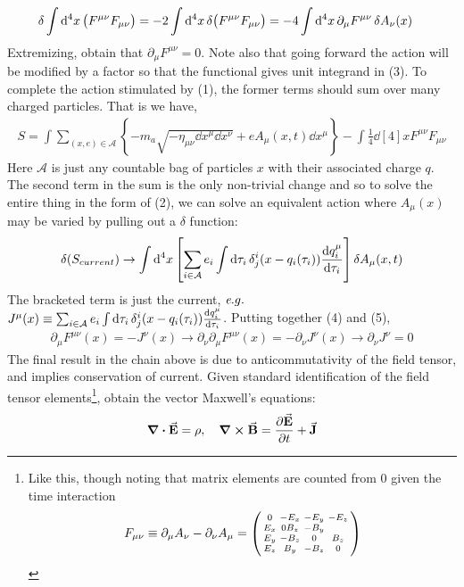 \documentclass[10pt]{scrartcl}
\newcommand{\eg}{{\textit e.g.}}
\begin{document}
\begin{align}
\var{\int \dd[4]{x}\left(F^{\mu\nu} F_{\mu\nu}\right)}	 = -2\int\dd[4]{x} \var(F^{\mu\nu}{F_{\mu\nu}}) &= -4\int\dd[4]{x}\partial_{\mu}F^{\mu\nu}\var{A_\nu(x)}
\end{align}
Extremizing, obtain that $\partial_\mu F^{\mu\nu} = 0$. Note also that going forward the action will be modified by a factor so that the functional gives unit integrand in (3). To complete the action stimulated by (1), the former terms should sum over many charged particles. That is we have,
\begin{align}
S = \int\sum_{(x, e)\in\mathcal{A}}\left\{-m_a\sqrt{-\eta_{\mu\nu}\dd{x}^\mu \dd{x}^{\nu}}+e A_{\mu}(x, t)\dd{x}^{\mu}\right\}-\int\frac{1}{4} \dd[4]{x} F^{\mu\nu}F_{\mu\nu}
\end{align}
Here $\mathcal{A}$ is just any countable bag of particles $x$ with their associated charge $q$.  The second term in the sum is the only non-trivial change and so to solve the entire thing in the form of (2), we can solve an equivalent action where $A_{\mu}(x)$ may be varied by pulling out a $\delta$ function:
\begin{align}
	\var(S_{current})\rightarrow \int\dd[4]{x} \left[\sum_{i\in\mathcal{A}}e_i \int\dd{\tau_i} \delta^{i}_{j}(x-q_i(\tau_i))
 \dv{{q}_{i}^{\mu}}{\tau_i}\right] \var{A_{\mu}(x, t)}
\end{align}
The bracketed term is just the current, $\eg$ $J^{\mu}(x)\equiv \sum_{i\in\mathcal{A}}e_i \int\dd{\tau_i} \delta^{i}_{j}(x-q_i(\tau_i)) \dv{{q}_{i}^{\mu}}{\tau_i}$. Putting together (4) and (5),
 \begin{align}
 \partial_{\mu}F^{\mu\nu}(x) = -J^{\nu}(x)\rightarrow \partial_\nu\partial_\mu F^{\mu\nu}(x) = - \partial_\nu J^{\nu}(x)\rightarrow \partial_\nu J^{\nu}=0
 \end{align}
The final result in the chain above is due to anticommutativity of the field tensor, and implies conservation of current. Given standard identification of the field tensor elements\footnote{Like this, though noting that matrix elements are counted from 0 given the time interaction  \[F_{\mu\nu} \equiv \partial_\mu A_\nu - \partial_\nu A_\mu = \smqty(0& - E_x& -E_y& -E_z\\E_x&0B_z&-B_y\\E_y&-B_z&0&B_z\\E_z&B_y&-B_z&0)\]
}, obtain the vector Maxwell's equations:
\begin{align}
 \div{\va{E}} = \rho \qc \curl{\va{B}} = \pdv{\va{E}}{t} + \va{J} 
\end{align}
\end{document}
